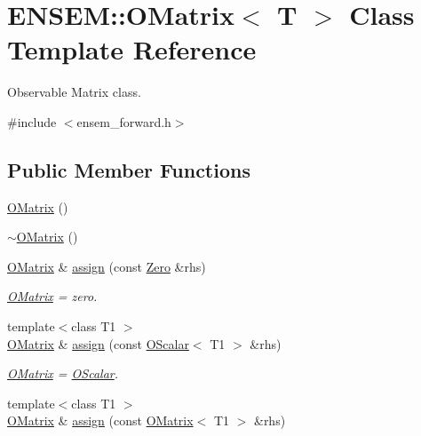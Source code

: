\hypertarget{classENSEM_1_1OMatrix}{}\section{E\+N\+S\+EM\+:\+:O\+Matrix$<$ T $>$ Class Template Reference}
\label{classENSEM_1_1OMatrix}


Observable Matrix class.  




{\ttfamily \#include $<$ensem\+\_\+forward.\+h$>$}

\subsection*{Public Member Functions}
\begin{DoxyCompactItemize}
\item 
\mbox{\hyperlink{classENSEM_1_1OMatrix_a65e880b856888dfd55e3f96b87afa0e7}{O\+Matrix}} ()
\item 
\mbox{\hyperlink{classENSEM_1_1OMatrix_a776f568bf59002385426232cba0c0d57}{$\sim$\+O\+Matrix}} ()
\item 
\mbox{\hyperlink{classENSEM_1_1OMatrix}{O\+Matrix}} \& \mbox{\hyperlink{classENSEM_1_1OMatrix_a9b8826edfb36e1bc701a7778424cfe31}{assign}} (const \mbox{\hyperlink{structENSEM_1_1Zero}{Zero}} \&rhs)
\begin{DoxyCompactList}\small\item\em \mbox{\hyperlink{classENSEM_1_1OMatrix}{O\+Matrix}} = zero. \end{DoxyCompactList}\item 
{\footnotesize template$<$class T1 $>$ }\\\mbox{\hyperlink{classENSEM_1_1OMatrix}{O\+Matrix}} \& \mbox{\hyperlink{classENSEM_1_1OMatrix_af0aaac940f907eb3db104e9f57b90a4f}{assign}} (const \mbox{\hyperlink{classENSEM_1_1OScalar}{O\+Scalar}}$<$ T1 $>$ \&rhs)
\begin{DoxyCompactList}\small\item\em \mbox{\hyperlink{classENSEM_1_1OMatrix}{O\+Matrix}} = \mbox{\hyperlink{classENSEM_1_1OScalar}{O\+Scalar}}. \end{DoxyCompactList}\item 
{\footnotesize template$<$class T1 $>$ }\\\mbox{\hyperlink{classENSEM_1_1OMatrix}{O\+Matrix}} \& \mbox{\hyperlink{classENSEM_1_1OMatrix_a37ed216c9ecfe42f7a357573699b3bfc}{assign}} (const \mbox{\hyperlink{classENSEM_1_1OMatrix}{O\+Matrix}}$<$ T1 $>$ \&rhs)

\end{DoxyCompactItemize}
